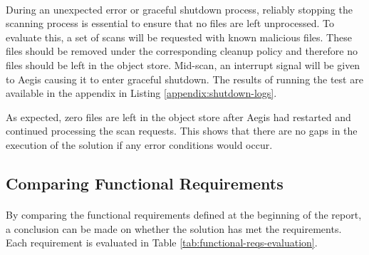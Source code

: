 \documentclass[12pt, conference, final, a4paper, onecolumn, compsoc]{IEEEtran}
\begin{document}
\paragraph{}
During an unexpected error or graceful shutdown process, reliably stopping the
scanning process is essential to ensure that no files are left unprocessed. To
evaluate this, a set of scans will be requested with known malicious files.
These files should be removed under the corresponding cleanup policy and
therefore no files should be left in the object store. Mid-scan, an interrupt
signal will be given to Aegis causing it to enter graceful shutdown. The results
of running the test are available in the appendix in Listing
\ref{appendix:shutdown-logs}.

As expected, zero files are left in the object store after Aegis had restarted
and continued processing the scan requests. This shows that there are no gaps in
the execution of the solution if any error conditions would occur.

\subsection{Comparing Functional Requirements}
\paragraph{}
By comparing the functional requirements defined at the beginning of the report,
a conclusion can be made on whether the solution has met the requirements. Each
requirement is evaluated in Table \ref{tab:functional-reqs-evaluation}.
\end{document}
